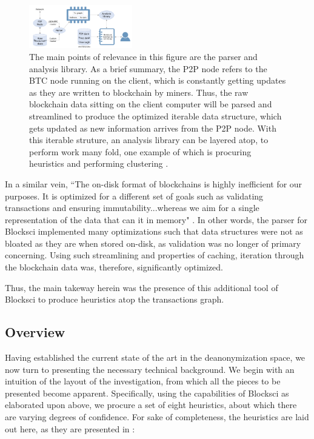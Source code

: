 \documentclass[journal]{IEEEtran}
\begin{document}
\begin{figure}
    \label{fig:blocksci}
    \centering
    \includegraphics[width=0.4\textwidth]{blocksci.png}
    \caption{The main points of relevance in this figure are the parser and analysis library. As a brief summary, the P2P node refers to the BTC node running on the client, which is constantly getting updates as they are written to blockchain by miners. Thus, the raw blockchain data sitting on the client computer will be parsed and streamlined to produce the optimized iterable data structure, which gets updated as new information arrives from the P2P node. With this iterable struture, an analysis library can be layered atop, to perform work many fold, one example of which is procuring heuristics and performing clustering \cite{blocksci}.}
\end{figure}

In a similar vein, ``The on-disk format of blockchains is highly inefficient for our purposes. It is optimized for a different set of goals such as validating transactions and ensuring immutability...whereas we aim for a single representation of the data that can it in memory" \cite{blocksci}. In other words, the parser for Blocksci implemented many optimizations such that data structures were not as bloated as they are when stored on-disk, as validation was no longer of primary concerning. Using such streamlining and properties of caching, iteration through the blockchain data was, therefore, significantly optimized.

Thus, the main takeway herein was the presence of this additional tool of Blocksci to produce heuristics atop the transactions graph.

\subsection{Overview}
Having established the current state of the art in the deanonymization space, we now turn to presenting the necessary technical background. We begin with an intuition of the layout of the investigation, from which all the pieces to be presented become apparent. Specifically, using the capabilities of Blocksci as elaborated upon above, we procure a set of eight heuristics, about which there are varying degrees of confidence. For sake of completeness, the heuristics are laid out here, as they are presented in \cite{heuristics}:
\end{document}
